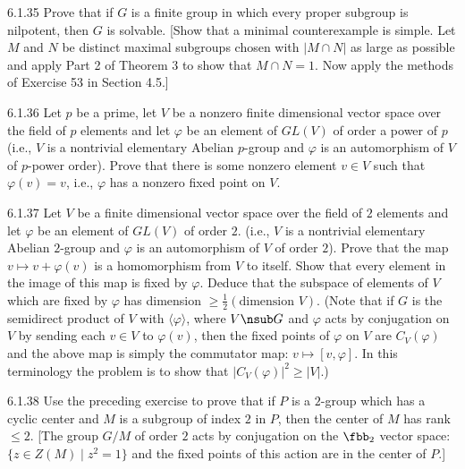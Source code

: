 \begin{exercise}{6.1.35}
    Prove that if $G$ is a finite group in which every proper subgroup is nilpotent, then $G$ is solvable.
    [Show that a minimal counterexample is simple.
    Let $M$ and $N$ be distinct maximal subgroups chosen with $|M \cap N|$ as large as possible and apply Part 2 of Theorem 3 to show that $M \cap N = 1$.
    Now apply the methods of Exercise 53 in Section 4.5.]
\end{exercise}

\begin{exercise}{6.1.36}
    Let $p$ be a prime, let $V$ be a nonzero finite dimensional vector space over the field of $p$ elements and let $\varphi$ be an element of $GL(V)$ of order a power of $p$ (i.e., $V$ is a nontrivial elementary Abelian $p$-group and $\varphi$ is an automorphism of $V$ of $p$-power order).
    Prove that there is some nonzero element $v \in V$ such that $\varphi(v) = v$, i.e., $\varphi$ has a nonzero fixed point on $V$.
\end{exercise}

\begin{exercise}{6.1.37}
    Let $V$ be a finite dimensional vector space over the field of $2$ elements and let $\varphi$ be an element of $GL(V)$ of order $2$. (i.e., $V$ is a nontrivial elementary Abelian $2$-group and $\varphi$ is an automorphism of $V$ of order $2$).
    Prove that the map $v \mapsto v + \varphi(v)$ is a homomorphism from $V$ to itself.
    Show that every element in the image of this map is fixed by $\varphi$.
    Deduce that the subspace of elements of $V$ which are fixed by $\varphi$ has dimension $\geq \frac{1}{2}(\text{dimension } V)$.
    (Note that if $G$ is the semidirect product of $V$ with $\langle \varphi \rangle$, where $V \nsub G$ and $\varphi$ acts by conjugation on $V$ by sending each $v \in V$ to $\varphi(v)$, then the fixed points of $\varphi$ on $V$ are $C_V(\varphi)$ and the above map is simply the commutator map: $v \mapsto [v, \varphi]$.
    In this terminology the problem is to show that $|C_V(\varphi)|^2 \geq |V|$.)
\end{exercise}

\begin{exercise}{6.1.38}
    Use the preceding exercise to prove that if $P$ is a $2$-group which has a cyclic center and $M$ is a subgroup of index $2$ in $P$, then the center of $M$ has rank $\leq 2$.
    [The group $G/M$ of order $2$ acts by conjugation on the $\fbb_2$ vector space: $\{z \in Z(M) \mid z^2 = 1\}$ and the fixed points of this action are in the center of $P$.]
\end{exercise}